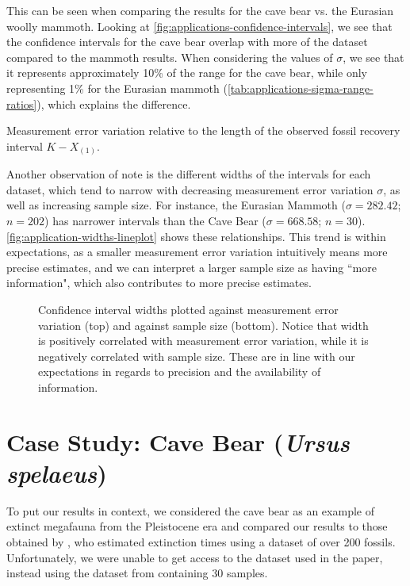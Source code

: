 This can be seen when comparing the results for the cave bear vs. the Eurasian woolly mammoth. Looking at \autoref{fig:applications-confidence-intervals}, we see that the confidence intervals for the cave bear overlap with more of the dataset compared to the mammoth results. When considering the values of $\sigma$, we see that it represents approximately 10\% of the range for the cave bear, while only representing 1\% for the Eurasian mammoth (\autoref{tab:applications-sigma-range-ratios}), which explains the difference.
\begin{table}[ht]
    \centering
    \caption{Measurement error variation relative to the length of the observed fossil recovery interval $K - X_{(1)}$.}
    
    \label{tab:applications-sigma-range-ratios}
    \vspace{-4mm}
\end{table}

Another observation of note is the different widths of the intervals for each dataset, which tend to narrow with decreasing measurement error variation $\sigma$, as well as increasing sample size. For instance, the Eurasian Mammoth ($\sigma = 282.42$; $n = 202$) has narrower intervals than the Cave Bear ($\sigma = 668.58$; $n = 30$). \autoref{fig:application-widths-lineplot} shows these relationships. This trend is within expectations, as a smaller measurement error variation intuitively means more precise estimates, and we can interpret a larger sample size as having ``more information", which also contributes to more precise estimates.
\begin{figure}[ht]
    \centering
    
    \caption{Confidence interval widths plotted against measurement error variation (top) and against sample size (bottom). Notice that width is positively correlated with measurement error variation, while it is negatively correlated with sample size. These are in line with our expectations in regards to precision and the availability of information.}
    \label{fig:application-widths-lineplot}
\end{figure}

\section{Case Study: Cave Bear (\textit{Ursus spelaeus})}

To put our results in context, we considered the cave bear as an example of extinct megafauna from the Pleistocene era and compared our results to those obtained by \citet{Baca2016}, who estimated extinction times using a dataset of over 200 fossils. Unfortunately, we were unable to get access to the dataset used in the paper, instead using the dataset from \citet{Cooper2015} containing 30 samples.

